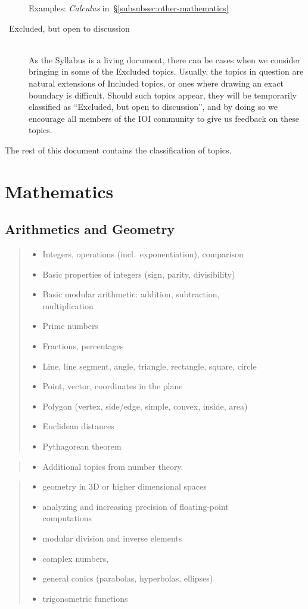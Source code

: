 \documentclass[a4paper,11pt,oneside]{article}
\newcommand{\cmark}{\ding{51}}%
\newcommand{\xmark}{\ding{55}}%
\newcommand{\Cincluded}{{\small\cmark}}
\newcommand{\Cdefine}{{\small\cmark\faFileTextO}}
\newcommand{\Ccodeonly}{{\small\cmark\faFileText}}
\newcommand{\Cexmaybe}{{\small\xmark\faQuestionCircle}}
\newcommand{\Cexcluded}{{\small\xmark}}
\newcommand{\Iincluded}{\item[\hbox to 1.8em{\Cincluded\hfill}]}
\newcommand{\Idefine}{\item[\hbox to 1.8em{\Cdefine\hfill}]}
\newcommand{\Icodeonly}{\item[\hbox to 1.8em{\Ccodeonly\hfill}]}
\newcommand{\Iexmaybe}{\item[\hbox to 1.8em{\Cexmaybe\hfill}]}
\newcommand{\Iexcluded}{\item[\hbox to 1.8em{\Cexcluded\hfill}]}
\newenvironment{myitemize}{\begin{quote}\begin{itemize}\itemsep 0pt}{\end{itemize}\end{quote}}
\begin{document}
\begin{description}
    Examples: \emph{Calculus\/} in~\S\ref{subsubsec:other-mathematics}

\item[\Cexmaybe\ Excluded, but open to discussion]~\\
    As the Syllabus is a living document, there can be cases when we consider
    bringing in some of the Excluded topics. Usually, the topics in question
    are natural extensions of Included topics, or ones where drawing an exact
    boundary is difficult. Should such topics appear, they will be temporarily
    classified as ``Excluded, but open to discussion'', and by doing so we encourage 
    all members of the IOI community to give us feedback on these topics.
\end{description}

\bigskip

\noindent
The rest of this document contains the classification of topics.

\section {Mathematics}
\label{subsec:mathematics}

\subsection {Arithmetics and Geometry}%
\label{subsubsec:NG}

    \begin{myitemize}
    \Iincluded Integers, operations (incl.\ exponentiation), comparison
    \Iincluded Basic properties of integers (sign, parity, divisibility)
    \Iincluded Basic modular arithmetic: addition, subtraction, \\ multiplication
    \Icodeonly Prime numbers
    \Iincluded Fractions, percentages
    \Iincluded Line, line segment, angle, triangle, rectangle, square, circle
    \Iincluded Point, vector, coordinates in the plane
    \Iincluded Polygon (vertex, side/edge, simple, convex, inside, area)
    \Idefine Euclidean distances
    \Icodeonly Pythagorean theorem
    \end{myitemize}

    \begin{myitemize}
    \Iexmaybe Additional topics from number theory.
    \end{myitemize}
    
    \begin{myitemize}
    \Iexcluded geometry in 3D or higher dimensional spaces
    \Iexcluded analyzing and increasing precision of floating-point \\ computations
    \Iexcluded modular division and inverse elements
    \Iexcluded complex numbers,
    \Iexcluded general conics (parabolas, hyperbolas, ellipses)
    \Iexcluded trigonometric functions
    \end{myitemize}
\end{document}
